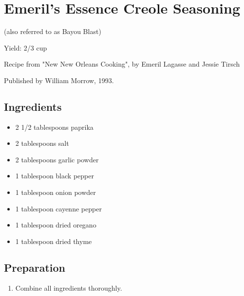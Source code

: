 \section{Emeril's Essence Creole Seasoning}

(also referred to as Bayou Blast)

\noindent Yield: 2/3 cup

\noindent Recipe from "New New Orleans Cooking", by Emeril Lagasse and Jessie Tirsch

\noindent Published by William Morrow, 1993.

\subsection{Ingredients}
\begin{multicols}{2}
\begin{itemize}
    \item 2 1/2 tablespoons paprika
    \item 2 tablespoons salt
    \item 2 tablespoons garlic powder
    \item 1 tablespoon black pepper
    \item 1 tablespoon onion powder
    \item 1 tablespoon cayenne pepper
    \item 1 tablespoon dried oregano
    \item 1 tablespoon dried thyme
\end{itemize}
\end{multicols}

\subsection{Preparation}
\begin{enumerate}
    \item Combine all ingredients thoroughly.
\end{enumerate}
